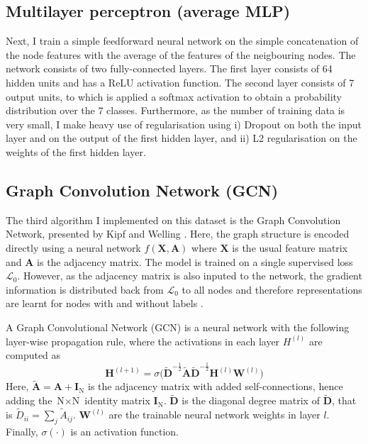 \documentclass[12pt]{article}
\theoremstyle{definition}
\begin{document}
\subsection{Multilayer perceptron (average MLP)}
Next, I train a simple feedforward neural network on the simple concatenation of the node features with the average of the features of the neigbouring nodes. The network consists of two fully-connected layers. The first layer consists of 64 hidden units and has a ReLU activation function. The second layer consists of 7 output units, to which is applied a softmax activation to obtain a probability distribution over the 7 classes. Furthermore, as the number of training data is very small, I make heavy use of regularisation using i) Dropout \cite{srivastava2014dropout} on both the input layer and on the output of the first hidden layer, and ii) L2 regularisation on the weights of the first hidden layer.

\subsection{Graph Convolution Network (GCN)}
The third algorithm I implemented on this dataset is the Graph Convolution Network, presented by Kipf and Welling \cite{kipf2017semi}. Here, the graph structure is encoded directly using a neural network $f(\mathbf{X}, \mathbf{A})$ where $\mathbf{X}$ is the usual feature matrix and $\mathbf{A}$ is the adjacency matrix. The model is trained on a single supervised loss $\mathcal{L}_0$. However, as the adjacency matrix is also inputed to the network, the gradient information is distributed back from $\mathcal{L}_0$ to all nodes and therefore representations are learnt for nodes with and without labels \cite{kipf2017semi}.

\bigskip

A Graph Convolutional Network (GCN) is a neural network with the following layer-wise propagation rule, where the activations in each layer $H^{(l)}$ are computed as
\[
\mathbf{H}^{(l+1)} = \sigma \big( \tilde{\mathbf{D}}^{-\frac{1}{2}} \tilde{\mathbf{A}} \tilde{\mathbf{D}}^{-\frac{1}{2}} \mathbf{H}^{(l)} \mathbf{W}^{(l)}\big)
\]
Here, $\tilde{\mathbf{A}} = \mathbf{A} + \mathbf{I}_\textrm{N}$ is the adjacency matrix with added self-connections, hence adding the $\textrm{N} \times \textrm{N}$ identity matrix $\mathbf{I}_\textrm{N}$. $\tilde{\mathbf{D}}$ is the diagonal degree matrix of $\tilde{\mathbf{D}}$, that is $\tilde{D}_{ii} = \sum_{j} \tilde{A}_{ij}$. $\mathbf{W}^{(l)}$ are the trainable neural network weights in layer $l$. Finally, $\sigma(\cdot)$ is an activation function.
\end{document}
